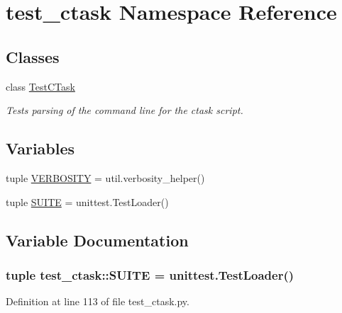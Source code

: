 \hypertarget{namespacetest__ctask}{
\section{test\-\_\-ctask \-Namespace \-Reference}
\label{namespacetest__ctask}
}
\subsection*{\-Classes}
\begin{DoxyCompactItemize}
\item 
class \hyperlink{classtest__ctask_1_1TestCTask}{\-Test\-C\-Task}
\begin{DoxyCompactList}\small\item\em \-Tests parsing of the command line for the ctask script. \end{DoxyCompactList}\end{DoxyCompactItemize}
\subsection*{\-Variables}
\begin{DoxyCompactItemize}
\item 
tuple \hyperlink{namespacetest__ctask_ae79de960cf6d3de15148c070e498fa04}{\-V\-E\-R\-B\-O\-S\-I\-T\-Y} = util.\-verbosity\-\_\-helper()
\item 
tuple \hyperlink{namespacetest__ctask_af37c1ecd400d08b69d35c89d7bd4523a}{\-S\-U\-I\-T\-E} = unittest.\-Test\-Loader()
\end{DoxyCompactItemize}


\subsection{\-Variable \-Documentation}
\hypertarget{namespacetest__ctask_af37c1ecd400d08b69d35c89d7bd4523a}{
\subsubsection[{\-S\-U\-I\-T\-E}]{\setlength{\rightskip}{0pt plus 5cm}tuple {\bf test\-\_\-ctask\-::\-S\-U\-I\-T\-E} = unittest.\-Test\-Loader()}}
\label{namespacetest__ctask_af37c1ecd400d08b69d35c89d7bd4523a}


\-Definition at line 113 of file test\-\_\-ctask.\-py.

